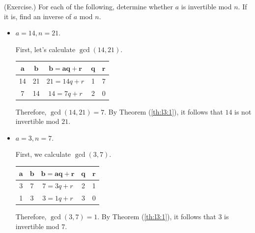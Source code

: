 \documentclass[letterpaper]{article}
\newcommand{\0}{\mathbf{0}}
\begin{document}
\begin{mdframed}
    (Exercise.) For each of the following, determine whether $a$ is invertible mod $n$. If it is, find an inverse of $a$ mod $n$. 
    \begin{itemize}
        \item $a = 14, n = 21$.
        \begin{mdframed}
            First, let's calculate $\gcd(14, 21)$. 
            \begin{center}
                \begin{tabular}{|c|c|c|c|c|}
                    \hline 
                    $\mathbf{a}$ & $\mathbf{b}$ & $\mathbf{b = aq + r}$ & $\mathbf{q}$ & $\mathbf{r}$ \\ 
                    \hline 
                    14 & 21 & $21 = 14q + r$ & 1 & 7 \\ 
                    7 & 14 & $14 = 7q + r$ & 2 & 0 \\ 
                    \hline 
                \end{tabular}
            \end{center}
            Therefore, $\gcd(14, 21) = 7$. By Theorem (\ref{th:l3:1}), it follows that $14$ is not invertible mod $21$. 
        \end{mdframed}

        \item $a = 3, n = 7$.
        \begin{mdframed}
            First, we calculate $\gcd(3, 7)$. 
            \begin{center}
                \begin{tabular}{|c|c|c|c|c|}
                    \hline 
                    $\mathbf{a}$ & $\mathbf{b}$ & $\mathbf{b = aq + r}$ & $\mathbf{q}$ & $\mathbf{r}$ \\ 
                    \hline 
                    3 & 7 & $7 = 3q + r$ & 2 & 1 \\ 
                    1 & 3 & $3 = 1q + r$ & 3 & 0 \\ 
                    \hline 
                \end{tabular}
            \end{center}
            Therefore, $\gcd(3, 7) = 1$. By Theorem (\ref{th:l3:1}), it follows that $3$ is invertible mod $7$.

            \bigskip 


\end{mdframed}
\end{itemize}
\end{mdframed}
\end{document}
